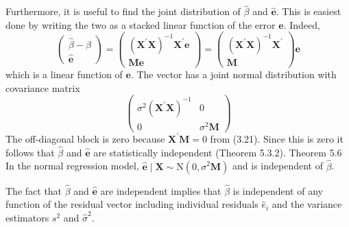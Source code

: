 \documentclass[10pt]{article}
\begin{document}
Furthermore, it is useful to find the joint distribution of $\widehat{\beta}$ and $\widehat{\boldsymbol{e}}$. This is easiest done by writing the two as a stacked linear function of the error $\boldsymbol{e}$. Indeed,
$$
\left(\begin{array}{c}
\widehat{\beta}-\beta \\
\widehat{\boldsymbol{e}}
\end{array}\right)=\left(\begin{array}{c}
\left(\boldsymbol{X}^{\prime} \boldsymbol{X}\right)^{-1} \boldsymbol{X}^{\prime} \boldsymbol{e} \\
\boldsymbol{M} \boldsymbol{e}
\end{array}\right)=\left(\begin{array}{c}
\left(\boldsymbol{X}^{\prime} \boldsymbol{X}\right)^{-1} \boldsymbol{X}^{\prime} \\
\boldsymbol{M}
\end{array}\right) \boldsymbol{e}
$$
which is a linear function of $\boldsymbol{e}$. The vector has a joint normal distribution with covariance matrix
$$
\left(\begin{array}{cc}
\sigma^{2}\left(\boldsymbol{X}^{\prime} \boldsymbol{X}\right)^{-1} & 0 \\
0 & \sigma^{2} \boldsymbol{M}
\end{array}\right)
$$
The off-diagonal block is zero because $\boldsymbol{X}^{\prime} \boldsymbol{M}=0$ from (3.21). Since this is zero it follows that $\widehat{\beta}$ and $\widehat{\boldsymbol{e}}$ are statistically independent (Theorem 5.3.2). Theorem 5.6 In the normal regression model, $\widehat{\boldsymbol{e}} \mid \boldsymbol{X} \sim \mathrm{N}\left(0, \sigma^{2} \boldsymbol{M}\right)$ and is independent of $\widehat{\beta}$.

The fact that $\widehat{\beta}$ and $\widehat{\boldsymbol{e}}$ are independent implies that $\widehat{\beta}$ is independent of any function of the residual vector including individual residuals $\widehat{e}_{i}$ and the variance estimators $s^{2}$ and $\widehat{\sigma}^{2}$.
\end{document}
